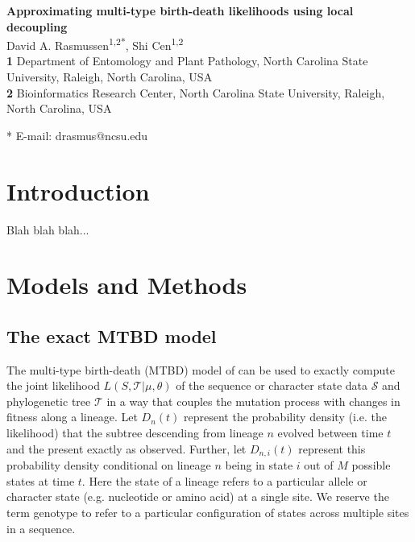 \documentclass[10pt]{article}
\date{}
\begin{document}
\begin{flushleft}
{\Large
\textbf{Approximating multi-type birth-death likelihoods using local decoupling}
}
\newline
\\
David A. Rasmussen\textsuperscript{1,2*},
Shi Cen\textsuperscript{1,2}
\\
\bigskip
\textbf{1} Department of Entomology and Plant Pathology, North Carolina State University, Raleigh, North Carolina, USA\\
\textbf{2} Bioinformatics Research Center, North Carolina State University, Raleigh, North Carolina, USA\\
\bigskip

* E-mail: drasmus@ncsu.edu
\end{flushleft}

\section*{Introduction}

Blah blah blah...

\section*{Models and Methods}

\subsection*{The exact MTBD model}

 
 

The multi-type birth-death (MTBD) model of \citet{stadler2013uncovering} can be used to exactly compute the joint likelihood $L(S,\mathcal{T} | \mu, \theta)$ of the sequence or character state data $\mathcal{S}$ and phylogenetic tree $\mathcal{T}$ in a way that couples the mutation process with changes in fitness along a lineage. Let $D_{n}(t)$ represent the probability density (i.e. the likelihood) that the subtree descending from lineage $n$ evolved between time $t$ and the present exactly as observed. Further, let $D_{n,i}(t)$ represent this probability density conditional on lineage $n$ being in state $i$ out of $M$ possible states at time $t$. Here the state of a lineage refers to a particular allele or character state (e.g. nucleotide or amino acid) at a single site. We reserve the term genotype to refer to a particular configuration of states across multiple sites in a sequence.
\end{document}

